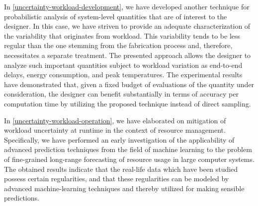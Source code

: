 In \cref{uncertainty-workload-development}, we have developed another technique
for probabilistic analysis of system-level quantities that are of interest to
the designer. In this case, we have striven to provide an adequate
characterization of the variability that originates from workload. This
variability tends to be less regular than the one stemming from the fabrication
process and, therefore, necessitates a separate treatment. The presented
approach allows the designer to analyze such important quantities subject to
workload variation as end-to-end delays, energy consumption, and peak
temperatures. The experimental results have demonstrated that, given a fixed
budget of evaluations of the quantity under consideration, the designer can
benefit substantially in terms of accuracy per computation time by utilizing the
proposed technique instead of direct sampling.

In \cref{uncertainty-workload-operation}, we have elaborated on mitigation of
workload uncertainty at runtime in the context of resource management.
Specifically, we have performed an early investigation of the applicability of
advanced prediction techniques from the field of machine learning to the problem
of fine-grained long-range forecasting of resource usage in large computer
systems. The obtained results indicate that the real-life data which have been
studied possess certain regularities, and that these regularities can be modeled
by advanced machine-learning techniques and thereby utilized for making sensible
predictions.
